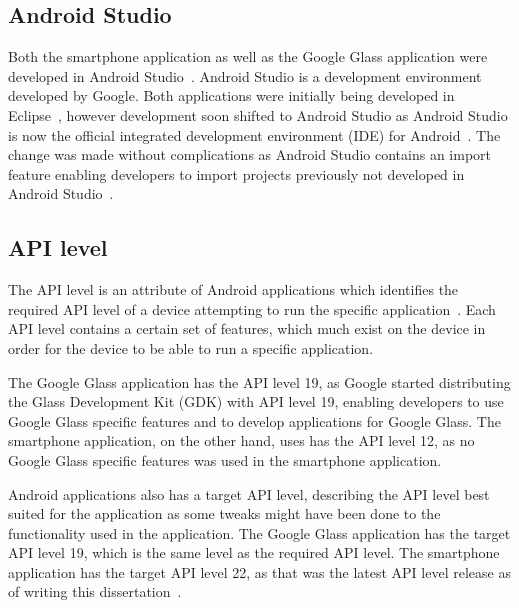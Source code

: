 

\subsection{Android Studio}
Both the smartphone application as well as the Google Glass application were developed in Android Studio~\cite{androidStudio}. Android Studio is a development environment developed by Google. Both applications were initially being developed in Eclipse~\cite{eclipse}, however development soon shifted to Android Studio as Android Studio is now the official integrated development environment (IDE) for Android~\cite{androidIDE}. The change was made without complications as Android Studio contains an import feature enabling developers to import projects previously not developed in Android Studio~\cite{androidIDE}.

\subsection{API level}
The API level is an attribute of Android applications which identifies the required API level of a device attempting to run the specific application~\cite{androidAPI}. Each API level contains a certain set of features, which much exist on the device in order for the device to be able to run a specific application.

The Google Glass application has the API level 19, as Google started distributing the Glass Development Kit (GDK) with API level 19, enabling developers to use Google Glass specific features and to develop applications for Google Glass. The smartphone application, on the other hand, uses has the API level 12, as no Google Glass specific features was used in the smartphone application.

Android applications also has a target API level, describing the API level best suited for the application as some tweaks might have been done to the functionality used in the application. The Google Glass application has the target API level 19, which is the same level as the required API level. The smartphone application has the target API level 22, as that was the latest API level release as of writing this dissertation~\cite{api22}.



